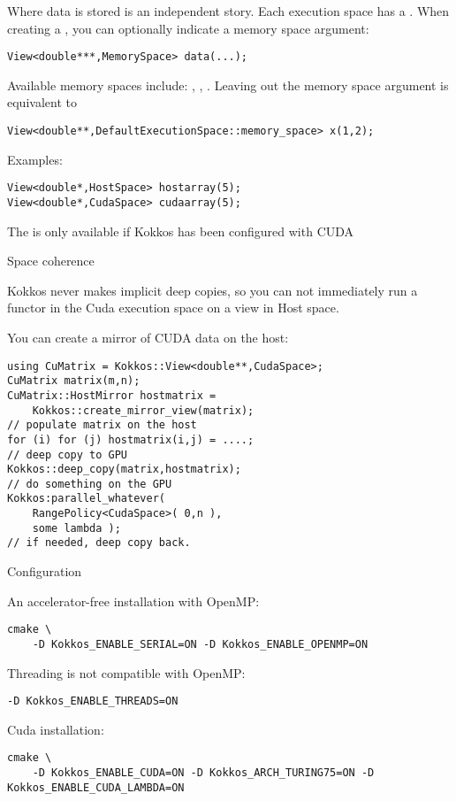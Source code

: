 Where data is stored is an independent story.
Each execution space has a .
When creating a ,
you can optionally indicate a memory space argument:
\begin{lstlisting}
View<double***,MemorySpace> data(...);
\end{lstlisting}
Available memory spaces include:
, , .
Leaving out the memory space argument is equivalent to
\begin{lstlisting}
View<double**,DefaultExecutionSpace::memory_space> x(1,2);
\end{lstlisting}

Examples:
\begin{lstlisting}
View<double*,HostSpace> hostarray(5);
View<double*,CudaSpace> cudaarray(5);
\end{lstlisting}

The  is only available
if Kokkos has been configured with \ac{CUDA}

 {Space coherence}

Kokkos never makes implicit deep copies,
so you can not immediately run a functor in the Cuda execution space
on a view in Host space.

You can create a mirror of CUDA data on the host:
\begin{lstlisting}using CuMatrix = Kokkos::View<double**,CudaSpace>;
CuMatrix matrix(m,n);
CuMatrix::HostMirror hostmatrix =
    Kokkos::create_mirror_view(matrix);
// populate matrix on the host
for (i) for (j) hostmatrix(i,j) = ....;
// deep copy to GPU
Kokkos::deep_copy(matrix,hostmatrix);
// do something on the GPU
Kokkos:parallel_whatever(
    RangePolicy<CudaSpace>( 0,n ),
    some lambda );
// if needed, deep copy back.
\end{lstlisting}

 {Configuration}

An accelerator-free installation with OpenMP:
\begin{verbatim}
cmake \
    -D Kokkos_ENABLE_SERIAL=ON -D Kokkos_ENABLE_OPENMP=ON
\end{verbatim}

Threading is not compatible with OpenMP:
\begin{verbatim}
-D Kokkos_ENABLE_THREADS=ON  
\end{verbatim}

Cuda installation:
\begin{verbatim}
cmake \
    -D Kokkos_ENABLE_CUDA=ON -D Kokkos_ARCH_TURING75=ON -D Kokkos_ENABLE_CUDA_LAMBDA=ON
\end{verbatim}

